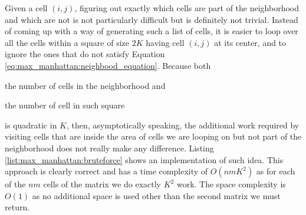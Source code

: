Given a cell $(i,j)$, figuring out exactly which cells are part of the neighborhood and which are
not is not particularly difficult but is definitely not trivial. Instead of coming up with a way of
generating such a list of cells, it is easier to loop over all the cells within a square of size
$2K$ having cell $(i,j)$ at its center, and to ignore the ones that do not satisfy Equation
\ref{eq:max_manhattan:neighbood_equation}. Because both 
\begin{enumerate*}
    \item the number of cells in the neighborhood and 
    \item the number of cell in such square \end{enumerate*} is quadratic in $K$, then,
asymptotically speaking, the additional work required by visiting cells that are inside the area of
cells we are looping on but not part of the neighborhood does not really make any difference.
Listing \ref{list:max_manhattan:bruteforce} shows an implementation of such idea. This approach is
clearly correct and has a time complexity of $O(nmK^2)$ as for each of the $nm$ cells of the matrix
we do exactly $K^2$ work. The space complexity is $O(1)$ as no additional space is used other than
the second matrix we must return.



